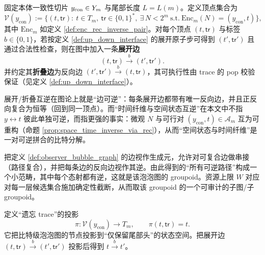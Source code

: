 \begin{definition}\label{def:observer_bubble_graph}
固定本体一致性切片 \(y_{\mathrm{con}}\in Y_m\) 与尾部长度 \(L=L(m)\)。定义顶点集合为
$$
\mathcal V(y_{\mathrm{con}}):=\bigl\{(t,\mathsf{tr}):\ t\in T_m,\ \mathsf{tr}\in\{0,1\}^\ast,\ \exists\,N<2^m\ \text{s.t.}\ \mathrm{Enc}_m(N)=(y_{\mathrm{con}},t)\bigr\},
$$
其中 \(\mathrm{Enc}_m\) 如定义 \ref{def:enc_rec_inverse_pair}。对每个顶点 \((t,\mathsf{tr})\) 与标签 \(b\in\{0,1\}\)，若按定义 \ref{def:up_down_interface} 的展开原子步可得到 \((t',\mathsf{tr}')\) 且通过合法性检查，则在图中加入一条\textbf{展开边}
$$
(t,\mathsf{tr})\xrightarrow{\,b\,}(t',\mathsf{tr}').
$$
并约定其\textbf{折叠边}为反向边 \((t',\mathsf{tr}')\xrightarrow{\,b\,}(t,\mathsf{tr})\)，其可执行性由 trace 的 pop 校验保证（见定义 \ref{def:up_down_interface}）。
\end{definition}

\begin{remark}
展开/折叠互逆在图论上就是“边可逆”：每条展开边都带有唯一反向边，并且正反向复合为恒等（回到同一顶点）。而“时间纤维与空间状态互逆”在本文中不指 \(y\leftrightarrow t\) 彼此单独可逆，而指更强的事实：微观 \(N\) 与可行对 \((y_{\mathrm{con}},t)\in\mathcal A_m\) 互为可重构（命题 \ref{prop:space_time_inverse_via_rec}），从而“空间状态与时间纤维”是一对可逆拼合的比特分解。
\end{remark}

\begin{definition}\label{def:groupoid_of_paths}
把定义 \ref{def:observer_bubble_graph} 的边视作生成元，允许对可复合边做串接（路径复合），并把每条边的反向边视作其逆。由此得到的“所有可逆路径”构成一个小范畴，其中每个态射都有逆，这就是该泡泡图的 groupoid。资源上限 \(W\) 对应对每一层候选集合施加确定性截断，从而取该 groupoid 的一个可审计的子图/子 groupoid。
\end{definition}

\begin{definition}\label{def:forget_log_projection}
定义“遗忘 trace”的投影
$$
\pi:\mathcal V(y_{\mathrm{con}})\to T_m,\qquad \pi(t,\mathsf{tr})=t.
$$
它把比特级泡泡图的节点投影到“仅保留尾部头”的状态空间。把展开边 \((t,\mathsf{tr})\xrightarrow{b}(t',\mathsf{tr}')\) 投影后得到 \(t\xrightarrow{b} t'\)。
\end{definition}

